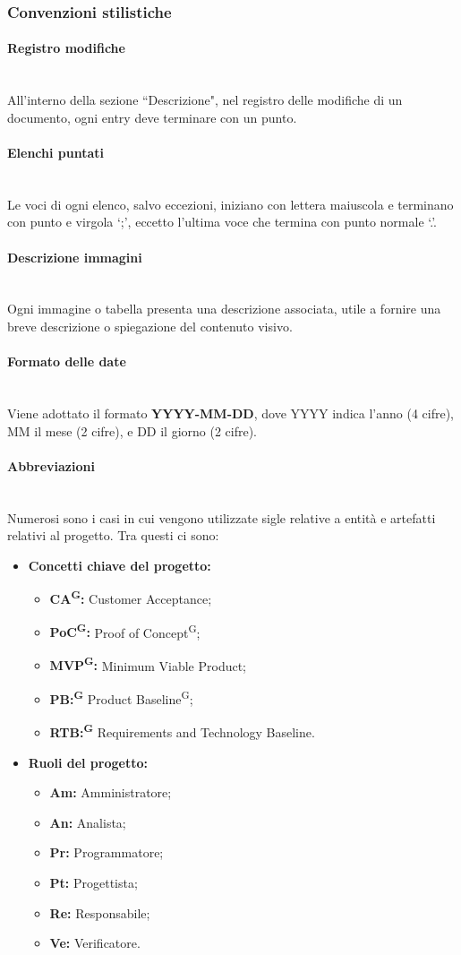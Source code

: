 \documentclass[8pt]{article}
\newcommand{\glossterm}[1]{#1\textsuperscript{G}} %
\newcommand{\subsubsubsection}[1]{\paragraph{#1}\mbox{}\\}
\begin{document}
\subsubsection{Convenzioni stilistiche}
\subsubsubsection{Registro modifiche}
All'interno della sezione ``Descrizione", nel registro delle modifiche di un documento, ogni entry deve terminare con un punto.
\subsubsubsection{Elenchi puntati}
Le voci di ogni elenco, salvo eccezioni, iniziano con lettera maiuscola e terminano con punto e
virgola `;', eccetto l'ultima voce che termina con punto normale `.'.
\subsubsubsection{Descrizione immagini}
Ogni immagine o tabella presenta una descrizione associata, utile a fornire una breve descrizione o spiegazione del contenuto visivo.
\subsubsubsection{Formato delle date}
Viene adottato il formato \textbf{YYYY-MM-DD}, dove YYYY indica l'anno (4 cifre), MM il mese (2
cifre), e DD il giorno (2 cifre).
\subsubsubsection{Abbreviazioni}
Numerosi sono i casi in cui vengono utilizzate sigle relative a entità e artefatti relativi al progetto. Tra questi ci sono:
\begin{itemize}
    \item \textbf{Concetti chiave del progetto:}
        \begin{itemize}
            \item \textbf{\glossterm{CA}:} Customer Acceptance;
            \item \textbf{\glossterm{PoC}:} \glossterm{Proof of Concept};
            \item \textbf{\glossterm{MVP}:} Minimum Viable Product;
            \item \textbf{\glossterm{PB:}} Product \glossterm{Baseline};
            \item \textbf{\glossterm{RTB:}} Requirements and Technology Baseline.
        \end{itemize}
    \item \textbf{Ruoli del progetto:}
        \begin{itemize}
            \item \textbf{Am:} Amministratore;
            \item \textbf{An:} Analista;
            \item \textbf{Pr:} Programmatore;
            \item \textbf{Pt:} Progettista;
            \item \textbf{Re:} Responsabile;
            \item \textbf{Ve:} Verificatore.
        \end{itemize}
\end{itemize}
\end{document}
